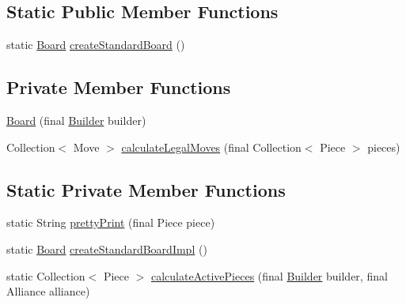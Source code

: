 \subsection*{Static Public Member Functions}
\begin{DoxyCompactItemize}
\item 
static \mbox{\hyperlink{classcom_1_1chess_1_1engine_1_1classic_1_1board_1_1_board}{Board}} \mbox{\hyperlink{classcom_1_1chess_1_1engine_1_1classic_1_1board_1_1_board_a5c85105e2c754cab7e37adaeb4243f1b}{create\+Standard\+Board}} ()
\end{DoxyCompactItemize}
\subsection*{Private Member Functions}
\begin{DoxyCompactItemize}
\item 
\mbox{\hyperlink{classcom_1_1chess_1_1engine_1_1classic_1_1board_1_1_board_a948fa5cb674ef814d68c4e5e195e37a6}{Board}} (final \mbox{\hyperlink{classcom_1_1chess_1_1engine_1_1classic_1_1board_1_1_board_1_1_builder}{Builder}} builder)
\item 
Collection$<$ Move $>$ \mbox{\hyperlink{classcom_1_1chess_1_1engine_1_1classic_1_1board_1_1_board_a4518ab116ca4d51efe4318f8f122c7e1}{calculate\+Legal\+Moves}} (final Collection$<$ Piece $>$ pieces)
\end{DoxyCompactItemize}
\subsection*{Static Private Member Functions}
\begin{DoxyCompactItemize}
\item 
static String \mbox{\hyperlink{classcom_1_1chess_1_1engine_1_1classic_1_1board_1_1_board_a64d5419367f3fdcb642cbd5d71c140ca}{pretty\+Print}} (final Piece piece)
\item 
static \mbox{\hyperlink{classcom_1_1chess_1_1engine_1_1classic_1_1board_1_1_board}{Board}} \mbox{\hyperlink{classcom_1_1chess_1_1engine_1_1classic_1_1board_1_1_board_a973e9a75cc7371052c75f01a025b2020}{create\+Standard\+Board\+Impl}} ()
\item 
static Collection$<$ Piece $>$ \mbox{\hyperlink{classcom_1_1chess_1_1engine_1_1classic_1_1board_1_1_board_adcc3302ae38841376f7578dbcae24043}{calculate\+Active\+Pieces}} (final \mbox{\hyperlink{classcom_1_1chess_1_1engine_1_1classic_1_1board_1_1_board_1_1_builder}{Builder}} builder, final Alliance alliance)
\end{DoxyCompactItemize}
